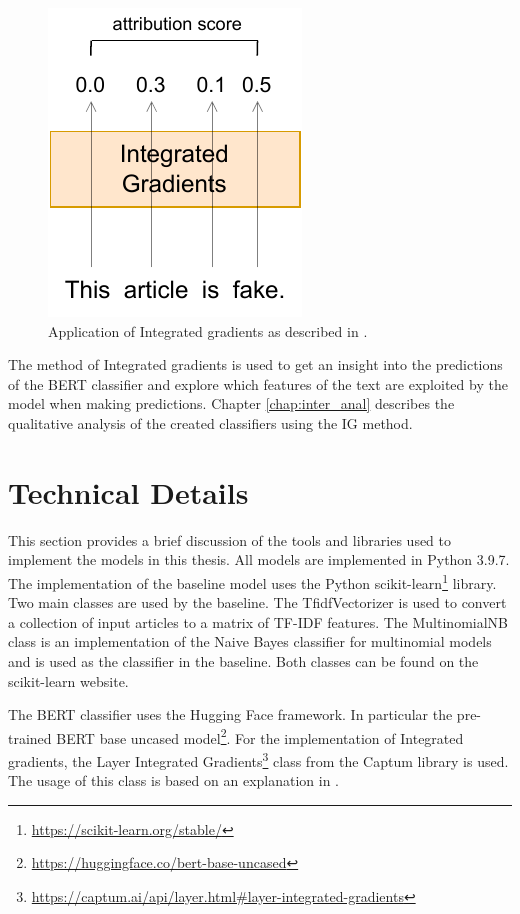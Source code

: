 \begin{figure}[H]
    \centering
    \includegraphics[scale=1]{obrazky-figures/ig.pdf}
    \caption{Application of Integrated gradients as described in \cite{integ_grads_towards}.}
    \label{fig:integ_grads2}
\end{figure}

The method of Integrated gradients is used to get an insight into the predictions of the BERT classifier and explore which features of the text are exploited by the model when making predictions. Chapter \ref{chap:inter_anal} describes the qualitative analysis of the created classifiers using the IG method.


\section{Technical Details}
\label{implementation}
This section provides a brief discussion of the tools and libraries used to implement the models in this thesis. All models are implemented in Python 3.9.7. The implementation of the baseline model uses the Python scikit-learn\footnote{\url{https://scikit-learn.org/stable/}} library. Two main classes are used by the baseline. The TfidfVectorizer is used to convert a collection of input articles to a matrix of TF-IDF features. The MultinomialNB class is an implementation of the Naive Bayes classifier for multinomial models and is used as the classifier in the baseline. Both classes can be found on the scikit-learn website. 

The BERT classifier uses the Hugging Face framework. In particular the pre-trained BERT base uncased model\footnote{\url{https://huggingface.co/bert-base-uncased}}. For the implementation of Integrated gradients, the Layer Integrated Gradients\footnote{\url{https://captum.ai/api/layer.html\#layer-integrated-gradients}} class from the Captum library is used. The usage of this class is based on an explanation in \cite{integ_grads_towards}.





